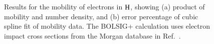 \documentclass{warpdoc}
\let\citen\cite
\begin{document}
%
\begin{figure}
\centering
{}
\caption{Results for the mobility of electrons in ${\rm H}$, showing (a) product of mobility and number density, and (b) error percentage of cubic spline fit of  mobility data. The BOLSIG+ calculation uses electron impact cross sections from the Morgan database in Ref.\ \citen{jcp:2012:morgan}.}
\label{fig:mobility_H}
\end{figure}
\end{document}
